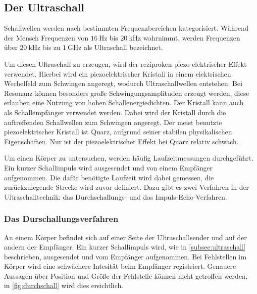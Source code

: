 \subsection{Der Ultraschall}
\label{subsec:ultraschall}

Schallwellen werden nach bestimmten Frequenzbereichen kategorisiert.
Während der Mensch Frequenzen von $\SI{16}{\hertz}$ bis $\SI{20}{\kilo\hertz}$ wahrnimmt, 
werden Frequenzen über $\SI{20}{\kilo\hertz}$ bis zu $\SI{1}{\giga\hertz}$ als Ultraschall bezeichnet.

\noindent
Um diesen Ultraschall zu erzeugen, wird der reziproken piezo-elektrischer Effekt verwendet.
Hierbei wird ein piezoelektrischer Kristall in einem elektrischen Wechelfeld zum Schwingen angeregt, wodurch Ultraschallwellen entstehen.
Bei Resonanz können besonders große Schwingungsamplituden erzeugt werden, diese erlauben eine Nutzung von hohen Schallenergiedichten.
Der Kristall kann auch als Schallempfänger verwendet werden. Dabei wird der Kristall durch die auftreffenden Schallwellen zum Schwingen angeregt.
Der meist benutzte piezoelektrischer Kristall ist Quarz, aufgrund seiner stabilen physikalischen Eigenschaften.
Nur ist der piezoelektrischer Effekt bei Quarz relativ schwach.

\noindent
Um einen Körper zu untersuchen, werden häufig Laufzeitmessungen durchgeführt.
Ein kurzer Schallimpuls wird ausgesendet und von einem Empfänger aufgenommen.
Die dafür benötigte Laufzeit wird dabei gemessen,  die zurückzulegende Strecke wird zuvor definiert.
Dazu gibt es zwei Verfahren in der Ultraschalltechnik: das Durchschallungs- und das Impuls-Echo-Verfahren.

\subsubsection{Das Durschallungsverfahren}
\label{subsubsec:durchschall}
An einem Körper befindet sich auf einer Seite der Ultraschallsender und auf der andern der Empfänger.
Ein kurzer Schallimpuls wird, wie in \autoref{subsec:ultraschall} beschrieben, ausgesendet und vom Empfänger aufgenommen.
Bei Fehlstellen im Körper wird eine schwächere Intesität beim Empfänger registriert.
Genauere Aussagen über Position und Größe der Fehlstelle können nicht getroffen werden, in \autoref{fig:durchschall} wird dies ersichtlich.


